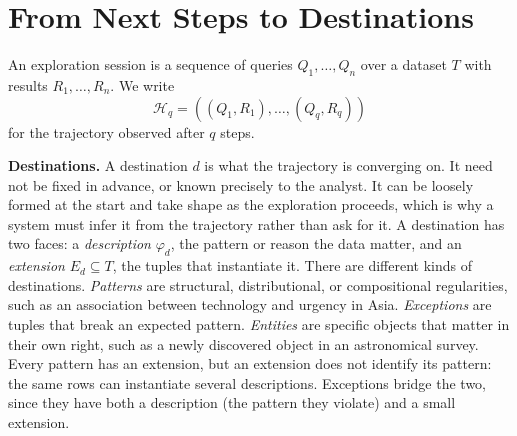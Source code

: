 \documentclass[sigconf]{acmart}
\begin{document}



\section{From Next Steps to Destinations}
\label{sec:destinations}

An exploration session is a sequence of queries $Q_1,\ldots,Q_n$ over a dataset $T$ with results $R_1,\ldots,R_n$. We write
\begin{equation}
\mathcal{H}_q=((Q_1,R_1),\ldots,(Q_q,R_q))
\end{equation}
for the trajectory observed after $q$ steps.

\textbf{Destinations.}
A destination $d$ is what the trajectory is converging on. It need not be fixed in advance, or known precisely to the analyst. It can be loosely formed at the start and take shape as the exploration proceeds, which is why a system must infer it from the trajectory rather than ask for it. A destination has two faces: a \emph{description} $\varphi_d$, the pattern or reason the data matter, and an \emph{extension} $E_d\subseteq T$, the tuples that instantiate it. There are different kinds of destinations. \emph{Patterns} are structural, distributional, or compositional regularities, such as an association between technology and urgency in Asia. \emph{Exceptions} are tuples that break an expected pattern. \emph{Entities} are specific objects that matter in their own right, such as a newly discovered object in an astronomical survey. Every pattern has an extension, but an extension does not identify its pattern: the same rows can instantiate several descriptions. Exceptions bridge the two, since they have both a description (the pattern they violate) and a small extension.
\end{document}
